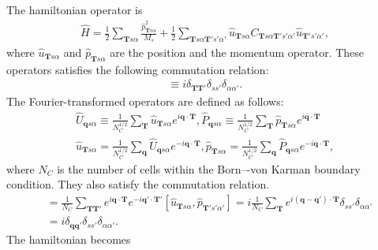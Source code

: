 \documentclass{article}
\begin{document}
The hamiltonian operator is
\begin{align}
    \hat{H} = \frac{1}{2}\sum_{\textbf{T}s\alpha}\frac{\hat{p}_{\textbf{T}s\alpha}^2}{M_s} 
    + \frac{1}{2}\sum_{\textbf{T}s\alpha \textbf{T}'s'\alpha'} \hat{u}_{\textbf{T}s\alpha} 
    C_{\textbf{T}s\alpha \textbf{T}'s'\alpha'} \hat{u}_{\textbf{T}'s'\alpha'},
\end{align}
where $\hat{u}_{\textbf{T}s\alpha}$ and $\hat{p}_{\textbf{T}s\alpha}$ are the position and the momentum operator.
These operators satisfies the following commutation relation:
\begin{align}
    [\hat{u}_{\textbf{T}s\alpha}, \hat{p}_{\textbf{T}'s'\alpha'}] \equiv i \delta_{\textbf{T}\textbf{T}'}\delta_{s s'}\delta_{\alpha \alpha'}.
\end{align}
The Fourier-transformed operators are defined as follows:
\begin{align}
    \hat{U}_{\textbf{q}s\alpha} \equiv \frac{1}{N_C^{1/2}} \sum_{\textbf{T}} \hat{u}_{\textbf{T}s\alpha} e^{i\textbf{q}\cdot\textbf{T}}
    ,
    \hat{P}_{\textbf{q}s\alpha} \equiv \frac{1}{N_C^{1/2}} \sum_{\textbf{T}} \hat{p}_{\textbf{T}s\alpha} e^{i\textbf{q}\cdot\textbf{T}}
    \\
    \hat{u}_{\textbf{T}s\alpha} = \frac{1}{N_C^{1/2}} \sum_{\textbf{q}} \hat{U}_{\textbf{q}s\alpha} e^{-i\textbf{q}\cdot\textbf{T}}
    ,
    \hat{p}_{\textbf{T}s\alpha} = \frac{1}{N_C^{1/2}} \sum_{\textbf{q}} \hat{P}_{\textbf{q}s\alpha} e^{-i\textbf{q}\cdot\textbf{T}},
    \label{eq_ftup}
\end{align}
where $N_C$ is the number of cells within the Born–-von Karman boundary condition.
They also satisfy the commutation relation.
\begin{align}
    [\hat{U}_{\textbf{q}s\alpha}, \hat{P}_{\textbf{q}'s'\alpha'}^\dagger] 
    &= \frac{1}{N_C}\sum_{\textbf{T}\textbf{T}'} e^{i\textbf{q}\cdot\textbf{T}}e^{-i\textbf{q}'\cdot\textbf{T}'}
    [\hat{u}_{\textbf{T}s\alpha}, \hat{p}_{\textbf{T}'s'\alpha'}]
    =
    i \frac{1}{N_C}\sum_{\textbf{T}} e^{i(\textbf{q}-\textbf{q}')\cdot\textbf{T}}
    \delta_{s s'}\delta_{\alpha \alpha'}
    \\
    &=i \delta_{\textbf{q}\textbf{q}'}\delta_{s s'}\delta_{\alpha \alpha'} .
\end{align}
The hamiltonian becomes
\end{document}

